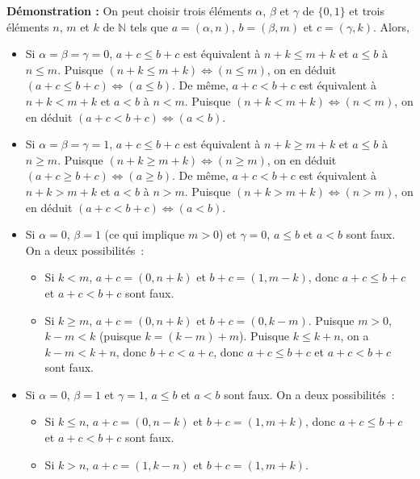 \noindent\textbf{Démonstration :} 
    On peut choisir trois éléments $\alpha$, $\beta$ et $\gamma$ de $\lbrace 0, 1 \rbrace$ et trois éléments $n$, $m$ et $k$ de $\mathbb{N}$ tels que $a = (\alpha, n)$, $b = (\beta, m)$ et $c = (\gamma, k)$.
    Alors, 
    \begin{itemize}[nosep]
        \item Si $\alpha = \beta = \gamma = 0$, $a + c \leq b + c$ est équivalent à $n + k \leq m + k$ et $a \leq b$ à $n \leq m$.
            Puisque $(n+k \leq m+k) \Leftrightarrow (n \leq m)$, on en déduit $(a + c \leq b + c) \Leftrightarrow (a \leq b)$.
            De même, $a + c < b + c$ est équivalent à $n + k < m + k$ et $a < b$ à $n < m$.
            Puisque $(n+k < m+k) \Leftrightarrow (n < m)$, on en déduit $(a + c < b + c) \Leftrightarrow (a < b)$.
        \item Si $\alpha = \beta = \gamma = 1$, $a + c \leq b + c$ est équivalent à $n + k \geq m + k$ et $a \leq b$ à $n \geq m$.
            Puisque $(n+k \geq m+k) \Leftrightarrow (n \geq m)$, on en déduit $(a + c \geq b + c) \Leftrightarrow (a \geq b)$.
            De même, $a + c < b + c$ est équivalent à $n + k > m + k$ et $a < b$ à $n > m$.
            Puisque $(n+k > m+k) \Leftrightarrow (n > m)$, on en déduit $(a + c < b + c) \Leftrightarrow (a < b)$.
        \item Si $\alpha = 0$, $\beta = 1$ (ce qui implique $m > 0$) et $\gamma = 0$, $a \leq b$ et $a < b$ sont faux. 
            On a deux possibilités : 
            \begin{itemize}[nosep]
                \item Si $k < m$, $a + c = (0, n+k)$ et $b + c = (1, m-k)$, donc $a+c \leq b+c$ et $a+c < b+c$ sont faux.
                \item Si $k \geq m$, $a + c = (0, n+k)$ et $b + c = (0, k-m)$.
                    Puisque $m > 0$, $k-m < k$ (puisque $k = (k-m) + m$). 
                    Puisque $k \leq k+n$, on a $k-m < k+n$, donc $b+c < a+c$, donc $a+c \leq b+c$ et $a+c < b+c$ sont faux.
            \end{itemize}
        \item Si $\alpha = 0$, $\beta = 1$ et $\gamma = 1$, $a \leq b$ et $a < b$ sont faux. 
            On a deux possibilités : 
            \begin{itemize}[nosep]
                \item Si $k \leq n$, $a + c = (0, n-k)$ et $b + c = (1, m+k)$, donc $a+c \leq b+c$ et $a+c < b+c$ sont faux.
                \item Si $k > n$, $a + c = (1, k-n)$ et $b + c = (1, m+k)$.

\end{itemize}
\end{itemize}
